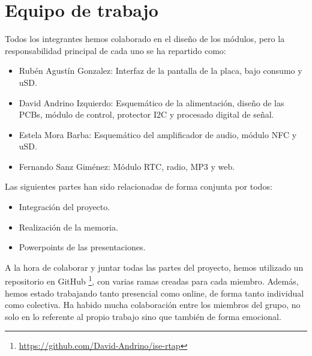 \section{Equipo de trabajo}

Todos los integrantes hemos colaborado en el diseño de los módulos, pero la responsabilidad principal de cada uno se ha repartido como:

\begin{itemize}
	\item Rubén Agustín Gonzalez: Interfaz de la pantalla de la placa, bajo consumo y uSD.
	\item David Andrino Izquierdo: Esquemático de la alimentación, diseño de las PCBs, módulo de control, protector I2C y procesado digital de señal.
	\item Estela Mora Barba: Esquemático del amplificador de audio, módulo NFC y uSD.
	\item Fernando Sanz Giménez: Módulo RTC, radio, MP3 y web.
\end{itemize}

Las siguientes partes han sido relacionadas de forma conjunta por todos:
\begin{itemize}
	\item Integración del proyecto.
	\item Realización de la memoria.
	\item Powerpoints de las presentaciones.
\end{itemize}

A la hora de colaborar y juntar todas las partes del proyecto, hemos utilizado un repositorio en GitHub \footnote{\url{https://github.com/David-Andrino/ise-rtap}}, con varias ramas creadas para cada miembro. Además, hemos estado trabajando tanto presencial como online, de forma tanto individual como colectiva. Ha habido mucha colaboración entre los miembros del grupo, no solo en lo referente al propio trabajo sino que también de forma emocional. 